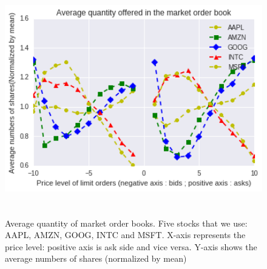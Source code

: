 \begin{figure}[hbtp]
	\begin{center}
		\includegraphics[width=5in, height=4in]{figures/level_quantity.png}
	\end{center}
	\caption{Average quantity of market order books. Five stocks that we use:  AAPL,  AMZN, GOOG, INTC and MSFT. X-axis represents the price level: positive axis is ask side and vice versa. Y-axis shows the average numbers of shares (normalized by mean)} \label{fig: level_quantity}
\end{figure}